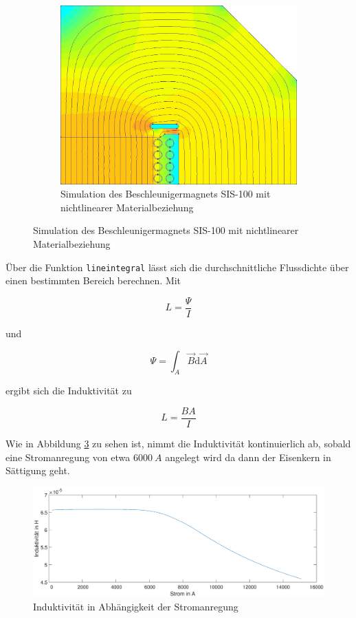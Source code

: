 \begin{figure}[h!]
\begin{subfigure}[h]{.60\textwidth}
		\includegraphics[width=\textwidth]{data/Nichtlinear}
		\caption{Simulation des Beschleunigermagnets SIS-100 mit nichtlinearer Materialbeziehung}
		\label{fig:NichtLinear}
	\end{subfigure}	
\end{figure}

Über die Funktion \texttt{lineintegral} lässt sich die durchschnittliche Flussdichte über einen bestimmten Bereich berechnen. Mit 

\begin{equation*}
	L = \frac{\Psi}{I}
\end{equation*}

und

\begin{equation*}
	\Psi = \int_{A} \vec{B} \mathrm{d}\vec{A}
\end{equation*}

ergibt sich die Induktivität zu

\begin{equation*}
	L = \frac{B A}{I}
\end{equation*}
 

 Wie in Abbildung \ref{fig:plot} zu sehen ist, nimmt die Induktivität kontinuierlich ab, sobald eine Stromanregung von etwa $\SI{6000}{A}$ angelegt wird da dann der Eisenkern in Sättigung geht.


\begin{figure}[h]
	\centering
	\includegraphics[width=\textwidth]{data/Ag8_3dplot}
	\caption{Induktivität in Abhängigkeit der Stromanregung}
	\label{fig:plot}
\end{figure}